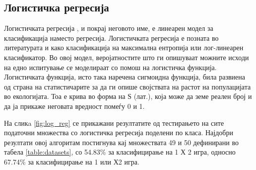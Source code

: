 \subsection{Логистичка регресија}
Логистичката регресија \cite{hosmer2013applied}, и покрај неговото име, е линеарен модел за класификација наместо регресија. Логистичката регресија е позната во литературата и како класификација на максимална ентропија или лог-линеарен класификатор. Во овој модел, веројатностите што ги опишуваат можните исходи на едно испитување се моделираат со помош на логистичка функција.
Логистичката функција, исто така наречена сигмоидна функција, била развиена од страна на статистичарите за да ги опише својствата на растот на популацијата во екологијата. Тоа е крива во форма на Ѕ (лат.), која може да земе реален број и да ја прикаже неговата вредност помеѓу 0 и 1.

На сликa \ref{fig:log_reg} се прикажани резултатите од тестирањето на сите податочни множества со логистичка регресија поделени по класа. Најдобри резултати овој алгоритам постигнува кај множествата 49 и 50 дефинирани во табела \ref{table:datasets}, со 54.83\% за класифицирање на 1 Х 2 игра, односно 67.74\% за класифицирање на 1 или Х2 игра.

